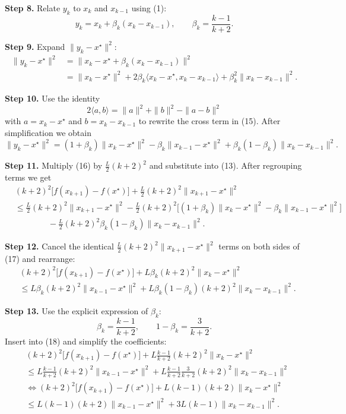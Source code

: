 \documentclass{article}
\begin{document}
\noindent\textbf{Step 8.} Relate $y_k$ to $x_k$ and $x_{k-1}$ using (1):
\[
y_k = x_k + \beta_k (x_k-x_{k-1}),\qquad \beta_k=\frac{k-1}{k+2}. \tag{14}
\]

\noindent\textbf{Step 9.} Expand $\|y_k-x^{\star}\|^{2}$:
\[
\begin{aligned}
\|y_k-x^{\star}\|^{2}
&= \|x_k-x^{\star} + \beta_k (x_k-x_{k-1})\|^{2}  \\
&= \|x_k-x^{\star}\|^{2}
   +2\beta_k\langle x_k-x^{\star},x_k-x_{k-1}\rangle
   +\beta_k^{2}\|x_k-x_{k-1}\|^{2}. \tag{15}
\end{aligned}
\]

\noindent\textbf{Step 10.} Use the identity
\[
2\langle a,b\rangle = \|a\|^{2}+\|b\|^{2}-\|a-b\|^{2}
\]
with $a=x_k-x^{\star}$ and $b=x_k-x_{k-1}$ to rewrite the cross term in (15). After simplification we obtain
\[
\|y_k-x^{\star}\|^{2}
= (1+\beta_k)\|x_k-x^{\star}\|^{2}
   -\beta_k\|x_{k-1}-x^{\star}\|^{2}
   +\beta_k(1-\beta_k)\|x_k-x_{k-1}\|^{2}. \tag{16}
\]

\noindent\textbf{Step 11.} Multiply (16) by $\frac{L}{2}(k+2)^{2}$ and substitute into (13). After regrouping terms we get
\[
\begin{aligned}
&(k+2)^{2}\bigl[f(x_{k+1})-f(x^{\star})\bigr] + \frac{L}{2}(k+2)^{2}\|x_{k+1}-x^{\star}\|^{2} \\
&\le \frac{L}{2}(k+2)^{2}\|x_{k+1}-x^{\star}\|^{2}
     -\frac{L}{2}(k+2)^{2}
       \bigl[(1+\beta_k)\|x_k-x^{\star}\|^{2}
         -\beta_k\|x_{k-1}-x^{\star}\|^{2}\bigr] \\
&\qquad\qquad
     -\frac{L}{2}(k+2)^{2}\beta_k(1-\beta_k)\|x_k-x_{k-1}\|^{2}. \tag{17}
\end{aligned}
\]

\noindent\textbf{Step 12.} Cancel the identical $\frac{L}{2}(k+2)^{2}\|x_{k+1}-x^{\star}\|^{2}$ terms on both sides of (17) and rearrange:
\[
\begin{aligned}
&(k+2)^{2}\bigl[f(x_{k+1})-f(x^{\star})\bigr]
+ L\beta_k(k+2)^{2}\|x_k-x^{\star}\|^{2} \\
&\le L\beta_k(k+2)^{2}\|x_{k-1}-x^{\star}\|^{2}
   + L\beta_k(1-\beta_k)(k+2)^{2}\|x_k-x_{k-1}\|^{2}. \tag{18}
\end{aligned}
\]

\noindent\textbf{Step 13.} Use the explicit expression of $\beta_k$:
\[
\beta_k = \frac{k-1}{k+2},\qquad
1-\beta_k = \frac{3}{k+2}.
\]
Insert into (18) and simplify the coefficients:
\[
\begin{aligned}
&(k+2)^{2}\bigl[f(x_{k+1})-f(x^{\star})\bigr]
+ L\frac{k-1}{k+2}(k+2)^{2}\|x_k-x^{\star}\|^{2} \\
&\le L\frac{k-1}{k+2}(k+2)^{2}\|x_{k-1}-x^{\star}\|^{2}
   + L\frac{k-1}{k+2}\frac{3}{k+2}(k+2)^{2}\|x_k-x_{k-1}\|^{2} \\
&\iff
(k+2)^{2}\bigl[f(x_{k+1})-f(x^{\star})\bigr]
+ L(k-1)(k+2)\|x_k-x^{\star}\|^{2} \\
&\le L(k-1)(k+2)\|x_{k-1}-x^{\star}\|^{2}
   + 3L(k-1)\|x_k-x_{k-1}\|^{2}. \tag{19}
\end{aligned}
\]
\end{document}
